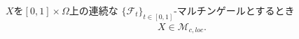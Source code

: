 	\begin{sketch}
	
	\end{sketch}
	
	\begin{screen}
		\begin{thm}[マルチンゲールは局所マルチンゲール]
			$X$を$[0,1] \times \Omega$上の連続な
			$\{\mathscr{F}_{t}\}_{t \in [0,1]}$-マルチンゲールとするとき
			\begin{align}
				X \in \mathscr{M}_{c,loc}.
			\end{align}
		\end{thm}
	\end{screen}
	
	\begin{sketch}
		
	\end{sketch}
	